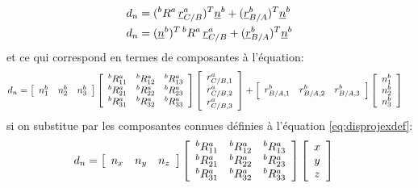 \begin{example}
\begin{align}
d_n &= ( {}^bR^a \, \underline{r}_{C/B}^a )^T \underline{n}^b + ( \underline{r}_{B/A}^b )^T \underline{n}^b \\
d_n &= ( \underline{n}^b )^T \, {}^bR^a \, \underline{r}_{C/B}^a + ( \underline{r}_{B/A}^b )^T \underline{n}^b 
\end{align} 
et ce qui correspond en termes de composantes à l'équation:
\begin{align}
d_n &= \left[ \begin{array}{c c c}
	n_1^b & n_2^b & n_3^b  
\end{array}  \right]
\left[ \begin{array}{c c c}
	{}^bR^a_{11} & {}^bR^a_{12} & {}^bR^a_{13} \\ 
	{}^bR^a_{21} & {}^bR^a_{22} & {}^bR^a_{23} \\
	{}^bR^a_{31} & {}^bR^a_{32} & {}^bR^a_{33}
\end{array}  \right]
 \left[ \begin{array}{c} r_{C/B,1}^a \\ r_{C/B,2}^a \\ r_{C/B,3}^a  \end{array} \right]
+
\left[ \begin{array}{c c c}
	r_{B/A,1}^b & r_{B/A,2}^b & r_{B/A,3}^b  
\end{array}  \right]
 \left[ \begin{array}{c} n_1^b \\ n_2^b \\ n_3^b  \end{array} \right]
\end{align} 
si on substitue par les composantes connues définies à l'équation \eqref{eq:disprojexdef}:
\begin{align}
d_n &=
\left[ \begin{array}{c c c}
	n_x & n_y & n_z  
\end{array}  \right]
\left[ \begin{array}{c c c}
	{}^bR^a_{11} & {}^bR^a_{12} & {}^bR^a_{13} \\ 
	{}^bR^a_{21} & {}^bR^a_{22} & {}^bR^a_{23} \\
	{}^bR^a_{31} & {}^bR^a_{32} & {}^bR^a_{33}
\end{array}  \right]
 \left[ \begin{array}{c} x \\ y \\ z  \end{array} \right]

\end{align}
\end{example}
